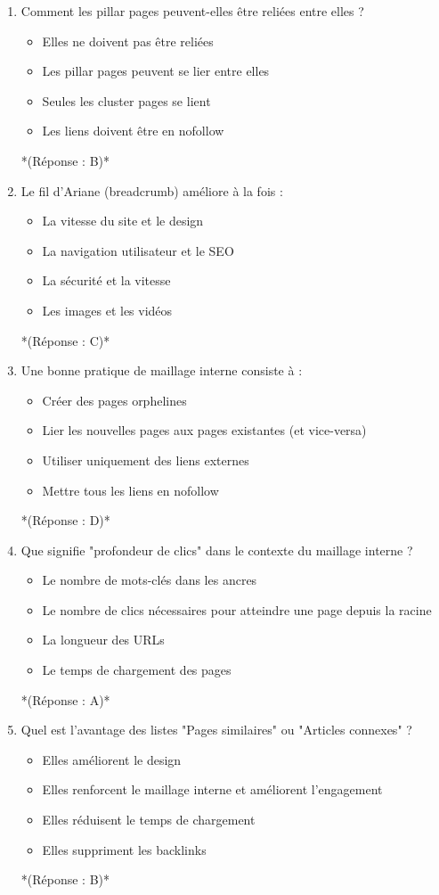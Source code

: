 \documentclass[12pt,a4paper,twoside]{report}
\begin{document}
\begin{enumerate}
\item Comment les pillar pages peuvent-elles être reliées entre elles ?
\begin{itemize}
\item[A)] Elles ne doivent pas être reliées
\item[B)] Les pillar pages peuvent se lier entre elles
\item[C)] Seules les cluster pages se lient
\item[D)] Les liens doivent être en nofollow
\end{itemize}
*(Réponse : B)*

\item Le fil d'Ariane (breadcrumb) améliore à la fois :
\begin{itemize}
\item[A)] La vitesse du site et le design
\item[B)] La navigation utilisateur et le SEO
\item[C)] La sécurité et la vitesse
\item[D)] Les images et les vidéos
\end{itemize}
*(Réponse : C)*

\item Une bonne pratique de maillage interne consiste à :
\begin{itemize}
\item[A)] Créer des pages orphelines
\item[B)] Lier les nouvelles pages aux pages existantes (et vice-versa)
\item[C)] Utiliser uniquement des liens externes
\item[D)] Mettre tous les liens en nofollow
\end{itemize}
*(Réponse : D)*

\item Que signifie "profondeur de clics" dans le contexte du maillage interne ?
\begin{itemize}
\item[A)] Le nombre de mots-clés dans les ancres
\item[B)] Le nombre de clics nécessaires pour atteindre une page depuis la racine
\item[C)] La longueur des URLs
\item[D)] Le temps de chargement des pages
\end{itemize}
*(Réponse : A)*

\item Quel est l'avantage des listes "Pages similaires" ou "Articles connexes" ?
\begin{itemize}
\item[A)] Elles améliorent le design
\item[B)] Elles renforcent le maillage interne et améliorent l'engagement
\item[C)] Elles réduisent le temps de chargement
\item[D)] Elles suppriment les backlinks
\end{itemize}
*(Réponse : B)*


\end{enumerate}
\end{document}
